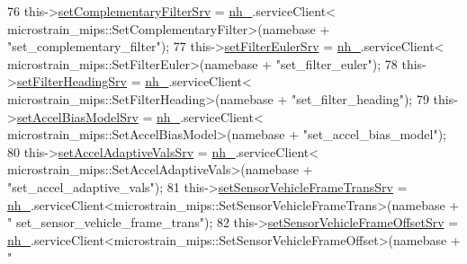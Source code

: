 \begin{DoxyCode}
76                 this->\hyperlink{classmicrostrain__mips__client_1_1ClMicrostainMips_a42e0fbe9912d59fe6dcd544945c34ad9}{setComplementaryFilterSrv} = \hyperlink{classmicrostrain__mips__client_1_1ClMicrostainMips_a9fa8bd8b528fb13bf655f87b950a145c}{nh\_}.serviceClient<
      microstrain\_mips::SetComplementaryFilter>(namebase + \textcolor{stringliteral}{"set\_complementary\_filter"});
77                 this->\hyperlink{classmicrostrain__mips__client_1_1ClMicrostainMips_ac6dd19db8020f5006b362cfc2196138c}{setFilterEulerSrv} = \hyperlink{classmicrostrain__mips__client_1_1ClMicrostainMips_a9fa8bd8b528fb13bf655f87b950a145c}{nh\_}.serviceClient<
      microstrain\_mips::SetFilterEuler>(namebase + \textcolor{stringliteral}{"set\_filter\_euler"});
78                 this->\hyperlink{classmicrostrain__mips__client_1_1ClMicrostainMips_aa83a0e93c3f31acb10044f01036bda75}{setFilterHeadingSrv} = \hyperlink{classmicrostrain__mips__client_1_1ClMicrostainMips_a9fa8bd8b528fb13bf655f87b950a145c}{nh\_}.serviceClient<
      microstrain\_mips::SetFilterHeading>(namebase + \textcolor{stringliteral}{"set\_filter\_heading"});
79                 this->\hyperlink{classmicrostrain__mips__client_1_1ClMicrostainMips_ab6245e0d38719e0cb59dc7efc8539d24}{setAccelBiasModelSrv} = \hyperlink{classmicrostrain__mips__client_1_1ClMicrostainMips_a9fa8bd8b528fb13bf655f87b950a145c}{nh\_}.serviceClient<
      microstrain\_mips::SetAccelBiasModel>(namebase + \textcolor{stringliteral}{"set\_accel\_bias\_model"});
80                 this->\hyperlink{classmicrostrain__mips__client_1_1ClMicrostainMips_a90afc14b3439c0951ceeb13a7a0e7854}{setAccelAdaptiveValsSrv} = \hyperlink{classmicrostrain__mips__client_1_1ClMicrostainMips_a9fa8bd8b528fb13bf655f87b950a145c}{nh\_}.serviceClient<
      microstrain\_mips::SetAccelAdaptiveVals>(namebase + \textcolor{stringliteral}{"set\_accel\_adaptive\_vals"});
81                 this->\hyperlink{classmicrostrain__mips__client_1_1ClMicrostainMips_a255d0c9b27b2f55013186e5210aed3d7}{setSensorVehicleFrameTransSrv} = 
      \hyperlink{classmicrostrain__mips__client_1_1ClMicrostainMips_a9fa8bd8b528fb13bf655f87b950a145c}{nh\_}.serviceClient<microstrain\_mips::SetSensorVehicleFrameTrans>(namebase + \textcolor{stringliteral}{"
      set\_sensor\_vehicle\_frame\_trans"});
82                 this->\hyperlink{classmicrostrain__mips__client_1_1ClMicrostainMips_aa1d74713d0892154282f67b8a7724bdb}{setSensorVehicleFrameOffsetSrv} = 
      \hyperlink{classmicrostrain__mips__client_1_1ClMicrostainMips_a9fa8bd8b528fb13bf655f87b950a145c}{nh\_}.serviceClient<microstrain\_mips::SetSensorVehicleFrameOffset>(namebase + \textcolor{stringliteral}{"
}
\end{DoxyCode}
